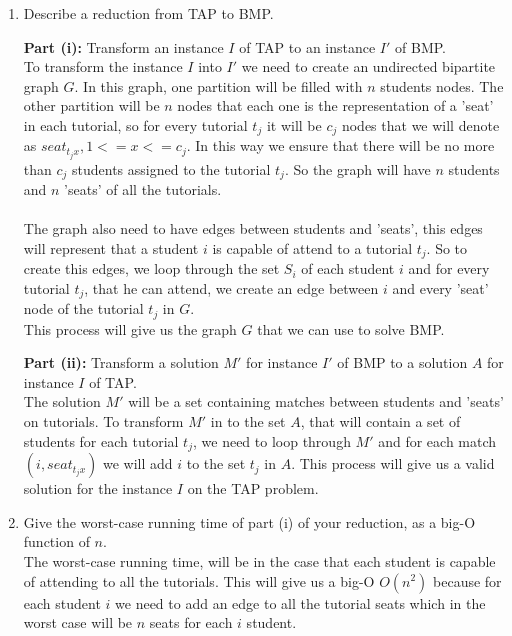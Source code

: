 \documentclass[11pt]{article}
\def\ans#1{{\color{ans}#1}}
\begin{document}
\begin{enumerate}
\item Describe a reduction from TAP to BMP.

\textbf{Part (i):} Transform an instance $I$ of TAP to an instance $I'$ of BMP.\\
\ans{
  To transform the instance $I$ into $I'$ we need to create an undirected bipartite graph $G$. In this 
  graph, one partition will be filled with $n$ students nodes. The other partition will be $n$ nodes 
  that each one is the representation of a 'seat' in each tutorial, so for every tutorial $t_j$ 
  it will be $c_j$ nodes that we will denote as $seat_{t_jx}, 1<=x<=c_j$. In this way we ensure that there will be no more than $c_j$ students 
  assigned to the tutorial $t_j$. So the graph will have $n$ students and $n$ 'seats' of all the 
  tutorials. \\ \\
  The graph also need to have edges between students and 'seats', this edges will represent that a 
  student $i$ is capable of attend to a tutorial $t_j$. So to create this edges, we loop through the 
  set $S_i$ of each student $i$ and for every tutorial $t_j$, that he can attend, we create an edge 
  between $i$ and every 'seat' node of the tutorial $t_j$ in $G$. \\
  This process will give us the graph $G$ that we can use to solve BMP.
}

\textbf{Part (ii):} Transform a solution $M'$ for instance $I'$ of BMP to
a solution $A$ for instance $I$ of TAP. \\
\ans{
  The solution $M'$ will be a set containing matches between students and 'seats' on tutorials. To 
  transform $M'$ in to the set $A$, that will contain a set of students for each tutorial $t_j$, we 
  need to loop through $M'$ and for each match $(i,seat_{t_jx})$ we will add $i$ to the set $t_j$ in 
  $A$. This process will give us a valid solution for the instance $I$ on the TAP problem.
}

\item Give the worst-case running time of part (i)
of your reduction, as a big-O function of $n$. \\
\ans{
  The worst-case running time, will be in the case that each student is capable of attending to all 
  the tutorials. This will give us a big-O $O(n^2)$ because for each student $i$ we need to add an edge 
  to all the tutorial seats which in the worst case will be $n$ seats for each $i$ student. 
}


\end{enumerate}
\end{document}
